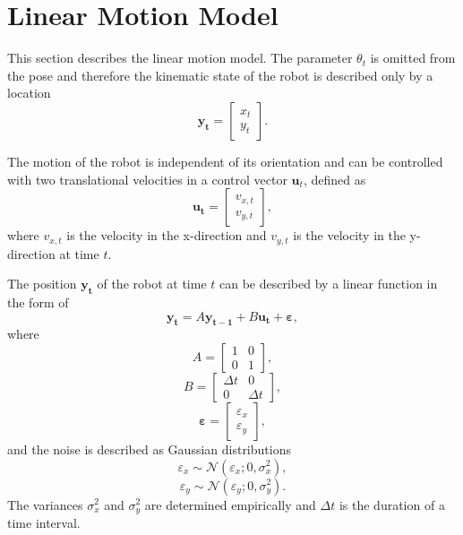\documentclass[12pt,oneside,openany,a4paper, %
afrikaans,english,
]{memoir}
\numberwithin{equation}{chapter}
\begin{document}
\section{Linear Motion Model}\label{sec:linearMotionModel}
This section describes the linear motion model. The parameter $\theta_t$ is omitted from the pose  and therefore the kinematic state of the robot is described only by a location
\begin{equation}
\bm{y_t} =
\begin{bmatrix}
x_t\\
y_t
\end{bmatrix}.
\end{equation}

The motion of the robot is independent of its orientation and can be controlled with two translational velocities in a control vector  $\bm{u}_t$, defined as
\begin{equation}
\bm{u_t} = 
\begin{bmatrix}
v_{x,t}\\
v_{y,t}
\end{bmatrix},
\end{equation}
where $v_{x,t}$ is the velocity in the x-direction and $v_{y,t}$ is the velocity in the y-direction at time $t$.

The position $\bm{y_t}$ of the robot at time $t$ can be described by a linear function in the form of
\begin{equation}\label{eq:lineartrans}
\bm{y_t} = A \bm{y_{t - 1}} + B \bm{u_t} + \bm{\varepsilon},
\end{equation}
where
\begin{equation}
A =
\begin{bmatrix}
1 & 0\\
0 & 1
\end{bmatrix},
\end{equation}
\begin{equation}
B = \begin{bmatrix}
\Delta t & 0\\
0 & \Delta t
\end{bmatrix},
\end{equation}
\begin{equation}
\bm{\varepsilon} =
\begin{bmatrix}
\varepsilon_x\\
\varepsilon_y
\end{bmatrix},
\end{equation}
and the noise is described as Gaussian distributions
\begin{equation}
\varepsilon_x \sim \mathcal{N}(\varepsilon_x; 0, \sigma_x^2),
\end{equation}
\begin{equation}
\varepsilon_y \sim \mathcal{N}(\varepsilon_y; 0, \sigma_y^2).
\end{equation}
The variances $\sigma_x^2$ and $\sigma_y^2$ are determined empirically and $\Delta t$ is the duration of a time interval.
\end{document}
